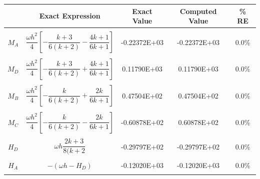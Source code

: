 \begin{table}[h!]
\centering
\begin{tabular}{ c| c c c c }
    & Exact Expression & Exact Value & Computed Value & \% RE \\ \hline \\
    $M_A$   & $\dfrac{\omega h^2}{4}[-\dfrac{k+3}{6(k+2)}-\dfrac{4k+1}{6k+1}]$ & %
                               -0.22372E+03 & -0.22372E+03 & 0.0\% \\ \\
    $M_D$   & $\dfrac{\omega h^2}{4}[-\dfrac{k+3}{6(k+2)}+\dfrac{4k+1}{6k+1}]$ & %
                                0.11790E+03 &  0.11790E+03 & 0.0\% \\ \\
    $M_B$   & $\dfrac{\omega h^2}{4}[-\dfrac{k}{6(k+2)}+\dfrac{2k}{6k+1}]$ & %
                                0.47504E+02 &  0.47504E+02 & 0.0\% \\ \\
    $M_C$   & $\dfrac{\omega h^2}{4}[-\dfrac{k}{6(k+2)}-\dfrac{2k}{6k+1}]$ & %
                               -0.60878E+02 &  0.60878E+02 & 0.0\% \\ \\
    $H_D$   & $\omega h \dfrac{2k+3}{8(k+2}$ & -0.29797E+02 & -0.29797E+02 & 0.0\% \\ \\
    $H_A$   & $-(\omega h-H_D)$ & -0.12020E+03 & -0.12020E+03 & 0.0\% \\ \\
\end{tabular}
\end{table}

%
%
\clearpage
